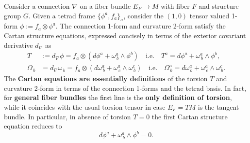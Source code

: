 \begin{mytheorem}
%
Consider a connection $\nabla$ on a fiber bundle $E_F \to M$ with fiber $F$ and structure group $G$.
Given a tetrad frame $\{\phi^a,f_a\}_a$, consider the $(1,0)$ tensor valued 1-form $\phi :=  f_a \otimes \phi^a$.
The connection 1-form and curvature 2-form satisfy the Cartan structure equations, expressed concisely in terms of the exterior covariant derivative $d_\nabla$ as
\begin{align}
    T &:= d_\nabla \phi = f_a \otimes \left(d \phi^a + \omega^a_{\, b} \wedge \phi^b \right) 
    \quad \text{i.e.} \quad T^a = d \phi^a + \omega^a_{\, b} \wedge \phi^b,
    \\
    \Omega_{\, b} &= d_\nabla \omega_{\, b} = f_a \otimes \left(d \omega^a_{\, b} + \omega^a_{\,c} \wedge \omega^c_{\, b}\right) 
    \quad\text{i.e.} \quad \Omega^a_{\, b} = d \omega^a_{\, b} + \omega^a_{\, c} \wedge \omega^c_{\, b}.
\end{align}
The \textbf{Cartan equations are essentially definitions} of the torsion $T$ and curvature 2-form in terms of the connection 1-forms and the tetrad basis.
In fact, for \textbf{general fiber bundles} the first line is the \textbf{only definition of torsion}, while it coincides with the usual torsion tensor in case $E_F = TM$ is the tangent bundle.
In particular, in absence of torsion $T=0$ the first Cartan structure equation reduces to
\begin{equation}
    d \phi^a + \omega^a_{\, b} \wedge \phi^b = 0.
\end{equation}
\end{mytheorem}
\vspace{-3mm}

